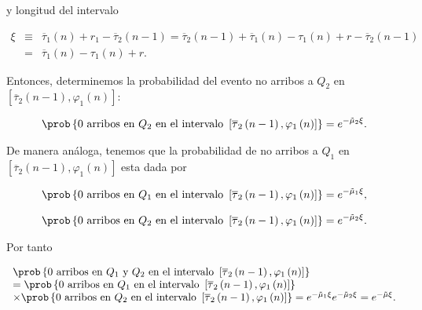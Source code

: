 y longitud del intervalo

\begin{eqnarray*}
\xi&\equiv&\overline{\tau}_{1}\left(n\right)+r_{1}-\overline{\tau}_{2}\left(n-1\right)
=\overline{\tau}_{2}\left(n-1\right)+\overline{\tau}_{1}\left(n\right)-\tau_{1}\left(n\right)+r-\overline{\tau}_{2}\left(n-1\right)\\
&=&\overline{\tau}_{1}\left(n\right)-\tau_{1}\left(n\right)+r.
\end{eqnarray*}


Entonces, determinemos la probabilidad del evento no arribos a $Q_{2}$ en $\left[\overline{\tau}_{2}\left(n-1\right),\varphi_{1}\left(n\right)\right]$:

\begin{eqnarray}
\prob\left\{0 \textrm{ arribos en }Q_{2}\textrm{ en el intervalo }\left[\overline{\tau}_{2}\left(n-1\right),\varphi_{1}\left(n\right)\right]\right\}
=e^{-\tilde{\mu}_{2}\xi}.
\end{eqnarray}

De manera an\'aloga, tenemos que la probabilidad de no arribos a $Q_{1}$ en $\left[\overline{\tau}_{2}\left(n-1\right),\varphi_{1}\left(n\right)\right]$ esta dada por

\begin{eqnarray}
\prob\left\{0 \textrm{ arribos en }Q_{1}\textrm{ en el intervalo }\left[\overline{\tau}_{2}\left(n-1\right),\varphi_{1}\left(n\right)\right]\right\}
=e^{-\tilde{\mu}_{1}\xi},
\end{eqnarray}

\begin{eqnarray}
\prob\left\{0 \textrm{ arribos en }Q_{2}\textrm{ en el intervalo }\left[\overline{\tau}_{2}\left(n-1\right),\varphi_{1}\left(n\right)\right]\right\}
=e^{-\tilde{\mu}_{2}\xi}.
\end{eqnarray}

Por tanto 

\begin{eqnarray}
\begin{array}{l}
\prob\left\{0 \textrm{ arribos en }Q_{1}\textrm{ y }Q_{2}\textrm{ en el intervalo }\left[\overline{\tau}_{2}\left(n-1\right),\varphi_{1}\left(n\right)\right]\right\}\\
=\prob\left\{0 \textrm{ arribos en }Q_{1}\textrm{ en el intervalo }\left[\overline{\tau}_{2}\left(n-1\right),\varphi_{1}\left(n\right)\right]\right\}\\
\times
\prob\left\{0 \textrm{ arribos en }Q_{2}\textrm{ en el intervalo }\left[\overline{\tau}_{2}\left(n-1\right),\varphi_{1}\left(n\right)\right]\right\}=e^{-\tilde{\mu}_{1}\xi}e^{-\tilde{\mu}_{2}\xi}
=e^{-\tilde{\mu}\xi}.
\end{array}
\end{eqnarray}


